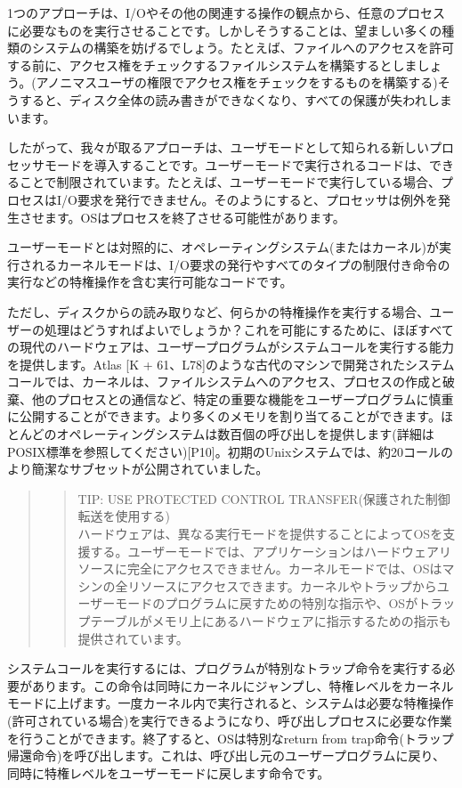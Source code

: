 1つのアプローチは、I/Oやその他の関連する操作の観点から、任意のプロセスに必要なものを実行させることです。しかしそうすることは、望ましい多くの種類のシステムの構築を妨げるでしょう。たとえば、ファイルへのアクセスを許可する前に、アクセス権をチェックするファイルシステムを構築するとしましょう。(アノニマスユーザの権限でアクセス権をチェックをするものを構築する)そうすると、ディスク全体の読み書きができなくなり、すべての保護が失われしまいます。

したがって、我々が取るアプローチは、ユーザモードとして知られる新しいプロセッサモードを導入することです。ユーザーモードで実行されるコードは、できることで制限されています。たとえば、ユーザーモードで実行している場合、プロセスはI/O要求を発行できません。そのようにすると、プロセッサは例外を発生させます。OSはプロセスを終了させる可能性があります。

ユーザーモードとは対照的に、オペレーティングシステム(またはカーネル)が実行されるカーネルモードは、I/O要求の発行やすべてのタイプの制限付き命令の実行などの特権操作を含む実行可能なコードです。

ただし、ディスクからの読み取りなど、何らかの特権操作を実行する場合、ユーザーの処理はどうすればよいでしょうか？これを可能にするために、ほぼすべての現代のハードウェアは、ユーザープログラムがシステムコールを実行する能力を提供します。Atlas
{[}K +
61、L78{]}のような古代のマシンで開発されたシステムコールでは、カーネルは、ファイルシステムへのアクセス、プロセスの作成と破棄、他のプロセスとの通信など、特定の重要な機能をユーザープログラムに慎重に公開することができます。より多くのメモリを割り当てることができます。ほとんどのオペレーティングシステムは数百個の呼び出しを提供します(詳細はPOSIX標準を参照してください){[}P10{]}。初期のUnixシステムでは、約20コールのより簡潔なサブセットが公開されていました。

\begin{quote}
\begin{quote}
TIP: USE PROTECTED CONTROL TRANSFER(保護された制御転送を使用する)\\
ハードウェアは、異なる実行モードを提供することによってOSを支援する。ユーザーモードでは、アプリケーションはハードウェアリソースに完全にアクセスできません。カーネルモードでは、OSはマシンの全リソースにアクセスできます。カーネルやトラップからユーザーモードのプログラムに戻すための特別な指示や、OSがトラップテーブルがメモリ上にあるハードウェアに指示するための指示も提供されています。
\end{quote}
\end{quote}

システムコールを実行するには、プログラムが特別なトラップ命令を実行する必要があります。この命令は同時にカーネルにジャンプし、特権レベルをカーネルモードに上げます。一度カーネル内で実行されると、システムは必要な特権操作(許可されている場合)を実行できるようになり、呼び出しプロセスに必要な作業を行うことができます。終了すると、OSは特別なreturn
from
trap命令(トラップ帰還命令)を呼び出します。これは、呼び出し元のユーザープログラムに戻り、同時に特権レベルをユーザーモードに戻します命令です。

